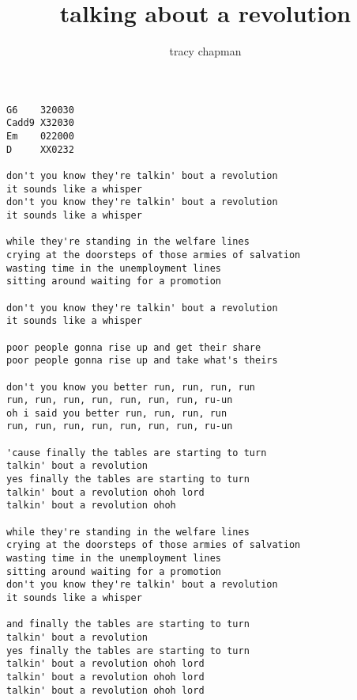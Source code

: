 \author{tracy chapman}
\title{talking about a revolution}
\maketitle
\begin{verbatim}
G6    320030 
Cadd9 X32030
Em    022000
D     XX0232

don't you know they're talkin' bout a revolution
it sounds like a whisper
don't you know they're talkin' bout a revolution
it sounds like a whisper

while they're standing in the welfare lines
crying at the doorsteps of those armies of salvation
wasting time in the unemployment lines
sitting around waiting for a promotion

don't you know they're talkin' bout a revolution
it sounds like a whisper

poor people gonna rise up and get their share
poor people gonna rise up and take what's theirs

don't you know you better run, run, run, run
run, run, run, run, run, run, run, ru-un
oh i said you better run, run, run, run
run, run, run, run, run, run, run, ru-un

'cause finally the tables are starting to turn
talkin' bout a revolution
yes finally the tables are starting to turn
talkin' bout a revolution ohoh lord
talkin' bout a revolution ohoh 

while they're standing in the welfare lines
crying at the doorsteps of those armies of salvation
wasting time in the unemployment lines
sitting around waiting for a promotion
don't you know they're talkin' bout a revolution
it sounds like a whisper

and finally the tables are starting to turn 
talkin' bout a revolution   
yes finally the tables are starting to turn
talkin' bout a revolution ohoh lord
talkin' bout a revolution ohoh lord
talkin' bout a revolution ohoh lord
\end{verbatim}